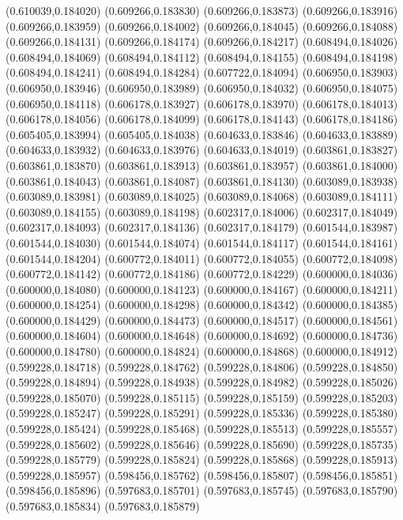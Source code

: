 (0.610039,0.184020)
(0.609266,0.183830)
(0.609266,0.183873)
(0.609266,0.183916)
(0.609266,0.183959)
(0.609266,0.184002)
(0.609266,0.184045)
(0.609266,0.184088)
(0.609266,0.184131)
(0.609266,0.184174)
(0.609266,0.184217)
(0.608494,0.184026)
(0.608494,0.184069)
(0.608494,0.184112)
(0.608494,0.184155)
(0.608494,0.184198)
(0.608494,0.184241)
(0.608494,0.184284)
(0.607722,0.184094)
(0.606950,0.183903)
(0.606950,0.183946)
(0.606950,0.183989)
(0.606950,0.184032)
(0.606950,0.184075)
(0.606950,0.184118)
(0.606178,0.183927)
(0.606178,0.183970)
(0.606178,0.184013)
(0.606178,0.184056)
(0.606178,0.184099)
(0.606178,0.184143)
(0.606178,0.184186)
(0.605405,0.183994)
(0.605405,0.184038)
(0.604633,0.183846)
(0.604633,0.183889)
(0.604633,0.183932)
(0.604633,0.183976)
(0.604633,0.184019)
(0.603861,0.183827)
(0.603861,0.183870)
(0.603861,0.183913)
(0.603861,0.183957)
(0.603861,0.184000)
(0.603861,0.184043)
(0.603861,0.184087)
(0.603861,0.184130)
(0.603089,0.183938)
(0.603089,0.183981)
(0.603089,0.184025)
(0.603089,0.184068)
(0.603089,0.184111)
(0.603089,0.184155)
(0.603089,0.184198)
(0.602317,0.184006)
(0.602317,0.184049)
(0.602317,0.184093)
(0.602317,0.184136)
(0.602317,0.184179)
(0.601544,0.183987)
(0.601544,0.184030)
(0.601544,0.184074)
(0.601544,0.184117)
(0.601544,0.184161)
(0.601544,0.184204)
(0.600772,0.184011)
(0.600772,0.184055)
(0.600772,0.184098)
(0.600772,0.184142)
(0.600772,0.184186)
(0.600772,0.184229)
(0.600000,0.184036)
(0.600000,0.184080)
(0.600000,0.184123)
(0.600000,0.184167)
(0.600000,0.184211)
(0.600000,0.184254)
(0.600000,0.184298)
(0.600000,0.184342)
(0.600000,0.184385)
(0.600000,0.184429)
(0.600000,0.184473)
(0.600000,0.184517)
(0.600000,0.184561)
(0.600000,0.184604)
(0.600000,0.184648)
(0.600000,0.184692)
(0.600000,0.184736)
(0.600000,0.184780)
(0.600000,0.184824)
(0.600000,0.184868)
(0.600000,0.184912)
(0.599228,0.184718)
(0.599228,0.184762)
(0.599228,0.184806)
(0.599228,0.184850)
(0.599228,0.184894)
(0.599228,0.184938)
(0.599228,0.184982)
(0.599228,0.185026)
(0.599228,0.185070)
(0.599228,0.185115)
(0.599228,0.185159)
(0.599228,0.185203)
(0.599228,0.185247)
(0.599228,0.185291)
(0.599228,0.185336)
(0.599228,0.185380)
(0.599228,0.185424)
(0.599228,0.185468)
(0.599228,0.185513)
(0.599228,0.185557)
(0.599228,0.185602)
(0.599228,0.185646)
(0.599228,0.185690)
(0.599228,0.185735)
(0.599228,0.185779)
(0.599228,0.185824)
(0.599228,0.185868)
(0.599228,0.185913)
(0.599228,0.185957)
(0.598456,0.185762)
(0.598456,0.185807)
(0.598456,0.185851)
(0.598456,0.185896)
(0.597683,0.185701)
(0.597683,0.185745)
(0.597683,0.185790)
(0.597683,0.185834)
(0.597683,0.185879)
